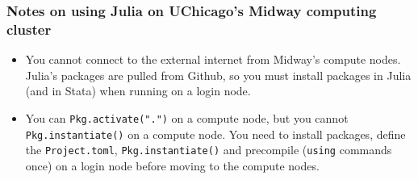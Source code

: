 \subsubsection{Notes on using Julia on UChicago's Midway computing cluster}
\begin{itemize}
\item
You cannot connect to the external internet from Midway's compute nodes.
Julia's packages are pulled from Github, so you must install packages in Julia (and in Stata) when running on a login node.
\item
You can \texttt{Pkg.activate(".")} on a compute node, but you cannot \texttt{Pkg.instantiate()} on a compute node.
You need to install packages, define the \texttt{Project.toml}, \texttt{Pkg.instantiate()} and precompile (\texttt{using} commands once) on a login node before moving to the compute nodes.
\end{itemize}

